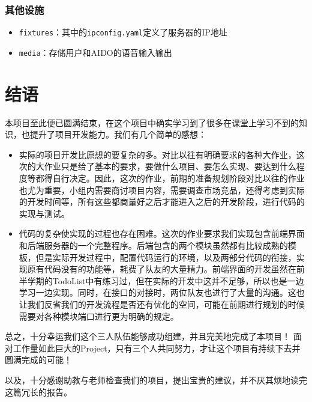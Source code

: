 \documentclass[logo,reportComp]{thesis}
\begin{document}
\subsubsection{其他设施}
\begin{itemize}
	\item \verb'fixtures'：其中的\verb'ipconfig.yaml'定义了服务器的IP地址
	\item \verb'media'：存储用户和AIDO的语音输入输出
\end{itemize}

\section{结语}

本项目至此便已圆满结束，在这个项目中确实学习到了很多在课堂上学习不到的知识，也提升了项目开发能力。我们有几个简单的感想：
\begin{itemize}
\item 实际的项目开发比原想的要复杂的多。对比以往有明确要求的各种大作业，这次的大作业只是给了基本的要求，要做什么项目、要怎么实现、要达到什么程度等都得自行决定。因此，这次的作业，前期的准备规划阶段对比以往的作业也尤为重要，小组内需要商讨项目内容，需要调查市场竞品，还得考虑到实际的开发时间等，所有这些都商量好之后才能进入之后的开发阶段，进行代码的实现与测试。
\item 代码的复杂使实现的过程也存在困难。这次的作业要求我们实现包含前端界面和后端服务器的一个完整程序。后端包含的两个模块虽然都有比较成熟的模板，但是实际开发过程中，配置代码运行的环境，以及两部分代码的衔接，实现原有代码没有的功能等，耗费了队友的大量精力。前端界面的开发虽然在前半学期的TodoList中有练习过，但在实际的开发中这并不足够，所以也是一边学习一边实现。同时，在接口的对接时，两位队友也进行了大量的沟通。这也让我们反省我们的开发流程是否还有优化的空间，可能在前期进行规划的时候需要对各种模块端口进行更为明确的规定。
\end{itemize}

总之，十分幸运我们这个三人队伍能够成功组建，并且完美地完成了本项目！
面对工作量如此巨大的Project，只有三个人共同努力，才让这个项目有持续下去并圆满完成的可能！

以及，十分感谢助教与老师检查我们的项目，提出宝贵的建议，并不厌其烦地读完这篇冗长的报告。
\end{document}
